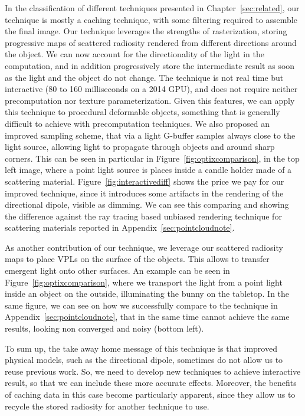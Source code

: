 In the classification of different techniques presented in Chapter~\ref{sec:related}, our technique is mostly a caching technique, with some filtering required to assemble the final image. Our technique leverages the strengths of rasterization, storing progressive maps of scattered radiosity rendered from different directions around the object. We can now account for the directionality of the light in the computation, and in addition progressively store the intermediate result as soon as the light and the object do not change. The technique is not real time but interactive (80 to 160 milliseconds on a 2014 GPU), and does not require neither precomputation nor texture parameterization. Given this features, we can apply this technique to procedural deformable objects, something that is generally difficult to achieve with precomputation techniques. We also proposed an improved sampling scheme, that via a light G-buffer samples always close to the light source, allowing light to propagate through objects and around sharp corners. This can be seen in particular in Figure~\ref{fig:optixcomparison}, in the top left image, where a point light source is places inside a candle holder made of a scattering material. Figure~\ref{fig:interactivediff} shows the price we pay for our improved technique, since it introduces some artifacts in the rendering of the directional dipole, visible as dimming. We can see this comparing and showing the difference against the ray tracing based unbiased rendering technique for scattering materials reported in Appendix~\ref{sec:pointcloudnote}.

As another contribution of our technique, we leverage our scattered radiosity maps to place VPLs on the surface of the objects. This allows to transfer emergent light onto other surfaces. An example can be seen in Figure~\ref{fig:optixcomparison}, where we transport the light from a point light inside an object on the outside, illuminating the bunny on the tabletop. In the same figure, we can see on how we successfully compare to the technique in Appendix~\ref{sec:pointcloudnote}, that in the same time cannot achieve the same results, looking non converged and noisy (bottom left).

To sum up, the take away home message of this technique is that improved physical models, such as the directional dipole, sometimes do not allow us to reuse previous work. So, we need to develop new techniques to achieve interactive result, so that we can include these more accurate effects. Moreover, the benefits of caching data in this case become particularly apparent, since they allow us to recycle the stored radiosity for another technique to use. 

